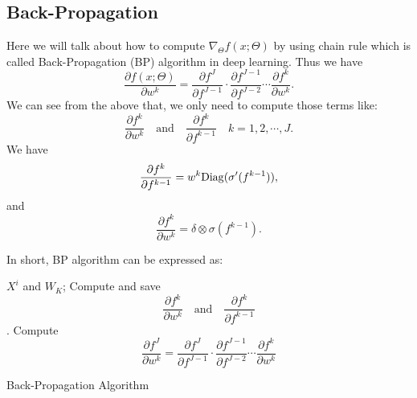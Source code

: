 
\subsection{Back-Propagation}
Here we will talk about how to compute $\nabla_{\Theta} f(x;\Theta)$ by using chain rule which is called Back-Propagation (BP) algorithm in deep learning. 
Thus we have
\begin{equation}
\frac{\partial {f}(x; \Theta)}{ \partial w^k} = \frac{\partial {f}^J}{\partial {f}^{J-1}} \cdot \frac{ \partial {f}^{J-1}}{\partial {f}^{J-2}} \cdots \frac{ \partial {f}^k}{\partial w^k}.
\end{equation}
We can see from the above that, we only need to compute those terms like:
\begin{equation}
\frac{ \partial {f}^k}{\partial w^{k}}  \quad \text{and} \quad \frac{\partial {f}^k}{\partial {f}^{k-1}}  \quad k = 1,2,\cdots,J.
\end{equation}
We have
\begin{equation}\label{eq:partial-f}
\frac{\partial {f}^k}{\partial {f}^{k-1}} =
w^k{\rm Diag}(\sigma'(f^{k-1})) ,
\end{equation}
and
\begin{equation}
\frac{ \partial {f}^k}{\partial w^{k}}  = \delta \otimes \sigma(f^{k-1}).
\end{equation}


In short, BP algorithm can be expressed as:
\begin{algorithm}[H]
	\begin{algorithmic}[1]
		  $X^i$ and $W_K$;
		\State Compute and save
		$$\frac{ \partial {f}^k}{\partial w^{k}}  \quad \text{and} \quad \frac{\partial {f}^k}{\partial {f}^{k-1}}$$.
		\State Compute
		$$\frac{ \partial {f}^J}{\partial w^{k}} = \frac{\partial {f}^J}{\partial {f}^{J-1}} \cdot \frac{ \partial {f}^{J-1}}{\partial {f}^{J-2}} \cdots \frac{ \partial {f}^k}{\partial w^{k}}$$ 
		\EndFor
	\end{algorithmic}
	\caption{Back-Propagation Algorithm}
\end{algorithm}




%

